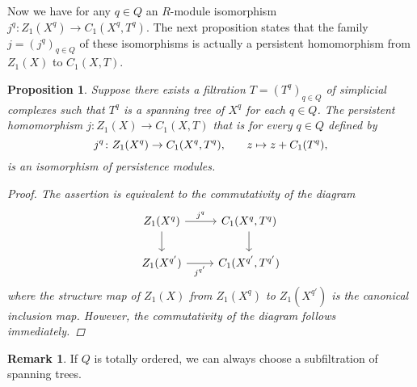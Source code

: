 \documentclass[oneside]{amsart}
\newtheorem{proposition}[theorem]{Proposition}
\theoremstyle{definition}
\newtheorem{remark}[theorem]{Remark}
\begin{document}
Now we have for any $q \in Q$ an $R$-module isomorphism $j^q\colon Z_1(X^q) \to C_1(X^q, T^q)$.
The next proposition states that the family $j = (j^q)_{q \in Q}$ of these isomorphisms is actually a persistent homomorphism from $Z_1(X)$ to $C_1(X, T)$.

\begin{proposition}%
    \label{proposition:PersistentFiltration}
    Suppose there exists a filtration $T = (T^q)_{q \in Q}$ of simplicial complexes such that $T^q$ is a spanning tree of $X^q$ for each $q \in Q$.
    The persistent homomorphism $j\colon Z_1(X) \to C_1(X, T)$ that is for every $q \in Q$ defined by
    \[ j^q\colon Z_1(X^q) \to C_1(X^q, T^q) \text, \qquad z \mapsto z + C_1(T^q) \text, \]
    is an isomorphism of persistence modules.

    \begin{proof}
        The assertion is equivalent to the commutativity of the diagram
        \[ \begin{tikzcd}[ampersand replacement=\&]
            Z_1(X^q) \& C_1(X^q, T^q) \\
            Z_1(X^{q'}) \& C_1(X^{q'}, T^{q'})
            \arrow[from=1-1, to=1-2, "j^q"]
            \arrow[from=1-1, to=2-1]
            \arrow[from=1-2, to=2-2]
            \arrow[from=2-1, to=2-2, "j^{q'}"']
        \end{tikzcd} \]
        where the structure map of $Z_1(X)$ from $Z_1(X^q)$ to $Z_1(X^{q'})$ is the canonical inclusion map.
        However, the commutativity of the diagram follows immediately.
    \end{proof}    
\end{proposition}

\begin{remark}
    If $Q$ is totally ordered, we can always choose a subfiltration of spanning trees.
\end{remark}
\end{document}
